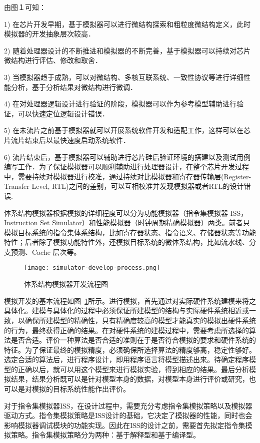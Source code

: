 由图１可知：


1) 在芯片开发早期，基于模拟器可以进行微结构探索和粗粒度微结构定义，此时模拟器的开发抽象层次较高．


2) 随着处理器设计的不断推进和模拟器的不断完善，基于模拟器可以持续对芯片微结构进行评估、修改和取舍．


3) 当模拟器趋于成熟，可以对微结构、多核互联系统、一致性协议等进行详细性能分析，基于分析结果对微结构进行微调．


4) 在对处理器逻辑设计进行验证的阶段，模拟器可以作为参考模型辅助进行验证，可以快速定位逻辑设计错误．


5) 在未流片之前基于模拟器就可以开展系统软件开发和适配工作，这样可以在芯片流片结束后以最快速度启动系统软件．


6) 流片结束后，基于模拟器可以辅助进行芯片硅后验证环境的搭建以及测试用例编写工作．为了保证模拟器可以顺利辅助进行处理器设计，在整个芯片开发过程中，需要持续对模拟器进行校准，通过持续对比模拟器和寄存器传输层(Register-Transfer Level, RTL)之间的差别，可以互相校准并发现模拟器或者RTL的设计错误\cite{hourui}.


体系结构模拟器根据模拟的详细程度可以分为功能模拟器（指令集模拟器 ISS，Instruction  Set  Simulator）和性能模拟器（时钟周期精确模拟器）两类。前者只模拟目标系统的指令集体系结构，比如寄存器状态、指令语义、存储器状态等功能特性；后者除了模拟功能特性外，还模拟目标系统的微体系结构，比如流水线、分支预测、Cache 层次等\cite{cachecengcideng}。
\begin{figure}[h]
  \centering
  \texttt{[image: simulator-develop-process.png]}
  \caption{体系结构模拟器开发流程图}
  \label{fig:sim-dev-process}
\end{figure}



模拟开发的基本流程如图~\ref{fig:sim-dev-process}所示。进行模拟，首先通过对实际硬件系统建模来将之具体化。建模与具体化的过程中必须保证所建模型的结构与实际硬件系统相近或一致，以确保所建模型的精确性，只有精确度较高的模型才能真实的模拟出硬件系统的行为，最终获得正确的结果。在对硬件系统的建模过程中，需要考虑所选择的算法是否合适。评价一种算法是否合适的准则在于是否符合模拟的要求和硬件系统的特征。为了保证最终的模拟精度，必须确保所选择算法的精度够高，稳定性够好。选定合适的算法后，进行程序设计，即用程序语言将模型描述出来。待确定程序模型的正确以后，就可以用这个模型来进行模拟实验，得到相应的结果。最后分析模拟结果，结果分析既可以是针对模型本身的数据，对模型本身进行评价或研究，也可以是对模拟的目标系统性能作出评价。


对于指令集模拟器ISS，在设计过程中，需要充分考虑指令集模拟策略以及模拟器驱动方式。指令集模拟策略是ISS设计的基础，它决定了模拟器的性能，同时也会影响模拟器调试模块的功能实现。因此在ISS的设计之前，需要首先拟定指令集模拟策略。指令集模拟策略分为两种：基于解释型和基于编译型。

